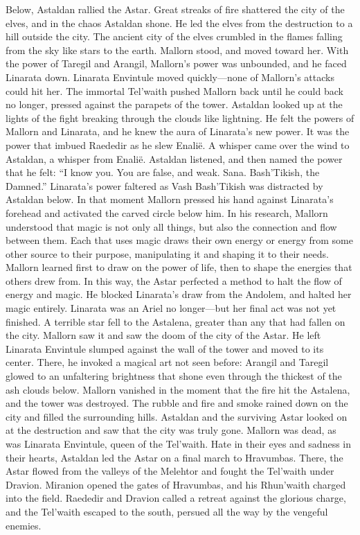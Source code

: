 \documentclass[smalldemyvopaper,11pt,twoside,onecolumn,openright,extrafontsizes]{memoir}
\begin{document}
Below, Astaldan rallied the Astar. Great streaks of fire shattered the city of the elves, and in the chaos Astaldan shone. He led the elves from the destruction to a hill outside the city. The ancient city of the elves crumbled in the flames falling from the sky like stars to the earth.
Mallorn stood, and moved toward her. With the power of Taregil and Arangil, Mallorn’s power was unbounded, and he faced Linarata down. Linarata Envintule moved quickly—none of Mallorn’s attacks could hit her. The immortal Tel’waith pushed Mallorn back until he could back no longer, pressed against the parapets of the tower. Astaldan looked up at the lights of the fight breaking through the clouds like lightning. He felt the powers of Mallorn and Linarata, and he knew the aura of Linarata’s new power. It was the power that imbued Raededir as he slew Enalië. A whisper came over the wind to Astaldan, a whisper from Enalië. Astaldan listened, and then named the power that he felt:
“I know you. You are false, and weak. Sana. Bash’Tikish, the Damned.”
Linarata’s power faltered as Vash Bash’Tikish was distracted by Astaldan below. In that moment Mallorn pressed his hand against Linarata’s forehead and activated the carved circle below him. In his research, Mallorn understood that magic is not only all things, but also the connection and flow between them. Each that uses magic draws their own energy or energy from some other source to their purpose, manipulating it and shaping it to their needs. Mallorn learned first to draw on the power of life, then to shape the energies that others drew from. In this way, the Astar perfected a method to halt the flow of energy and magic. He blocked Linarata’s draw from the Andolem, and halted her magic entirely. Linarata was an Ariel no longer—but her final act was not yet finished. A terrible star fell to the Astalena, greater than any that had fallen on the city. Mallorn saw it and saw the doom of the city of the Astar. He left Linarata Envintule slumped against the wall of the tower and moved to its center. There, he invoked a magical art not seen before: Arangil and Taregil glowed to an unfaltering brightness that shone even through the thickest of the ash clouds below. Mallorn vanished in the moment that the fire hit the Astalena, and the tower was destroyed. The rubble and fire and smoke rained down on the city and filled the surrounding hills. Astaldan and the surviving Astar looked on at the destruction and saw that the city was truly gone. Mallorn was dead, as was Linarata Envintule, queen of the Tel’waith.
Hate in their eyes and sadness in their hearts, Astaldan led the Astar on a final march to Hravumbas. There, the Astar flowed from the valleys of the Melehtor and fought the Tel’waith under Dravion. Miranion opened the gates of Hravumbas, and his Rhun’waith charged into the field. Raededir and Dravion called a retreat against the glorious charge, and the Tel’waith escaped to the south, persued all the way by the vengeful enemies.
\end{document}
